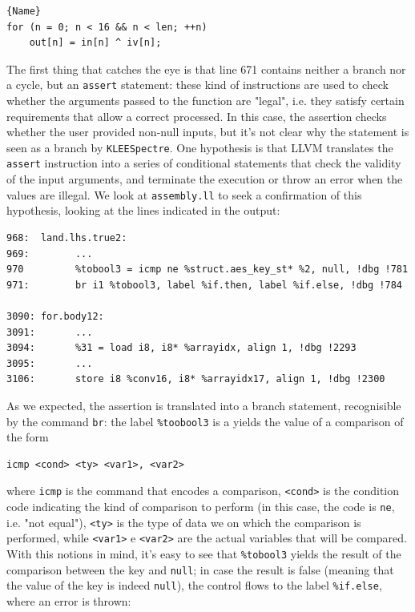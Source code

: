 \documentclass[12pt,a4paper]{book}
\theoremstyle{definition}
\begin{document}
	\begin{minipage}{.7\textwidth}
\begin{lstlisting}[caption={\texttt{cbc128.c}}, label=cbc128_3, firstnumber=60]{Name}
for (n = 0; n < 16 && n < len; ++n)
	out[n] = in[n] ^ iv[n];
\end{lstlisting}
	\end{minipage}
	\vspace{3mm}
	
	The first thing that catches the eye is that line 671 contains neither a branch nor a cycle, but an \texttt{assert} statement: these kind of instructions are used to check whether the arguments passed to the function are "legal", i.e. they satisfy certain requirements that allow a correct processed. In this case, the assertion checks whether the user provided non-null inputs, but it's not clear why the statement is seen as a branch by \texttt{KLEESpectre}. One hypothesis is that LLVM translates the \texttt{assert} instruction into a series of conditional statements that check the validity of the input arguments, and terminate the execution or throw an error when the values are illegal. We look at \texttt{assembly.ll} to seek a confirmation of this hypothesis, looking at the lines indicated in the output:
	
	\begin{lstlisting}[caption={\texttt{assembly.ll}}, numbers=none]
968:  land.lhs.true2: 
969:        ...
970			%tobool3 = icmp ne %struct.aes_key_st* %2, null, !dbg !781
971:  		br i1 %tobool3, label %if.then, label %if.else, !dbg !784
		
3090: for.body12:
3091:		...
3094:		%31 = load i8, i8* %arrayidx, align 1, !dbg !2293
3095:		...
3106:		store i8 %conv16, i8* %arrayidx17, align 1, !dbg !2300
	\end{lstlisting}

	As we expected, the assertion is translated into a branch statement, recognisible by the command \texttt{br}: the label \texttt{\%toobool3} is a yields the value of a comparison of the form
	
	\begin{lstlisting}[numbers=none, frame=none]
	icmp <cond> <ty> <var1>, <var2> 
	\end{lstlisting}
	
	where \texttt{icmp} is the command that encodes a comparison, \texttt{<cond>} is the condition code indicating the kind of comparison to perform (in this case, the code is \texttt{ne}, i.e. "not equal"), \texttt{<ty>} is the type of data we on which the comparison is performed, while \texttt{<var1>} e \texttt{<var2>} are the actual variables that will be compared. With this notions in mind, it's easy to see that \texttt{\%tobool3} yields the result of the comparison between the key and \texttt{null}; in case the result is false (meaning that the value of the key is indeed \texttt{null}), the control flows to the label \texttt{\%if.else}, where an error is thrown:
	
\end{document}
